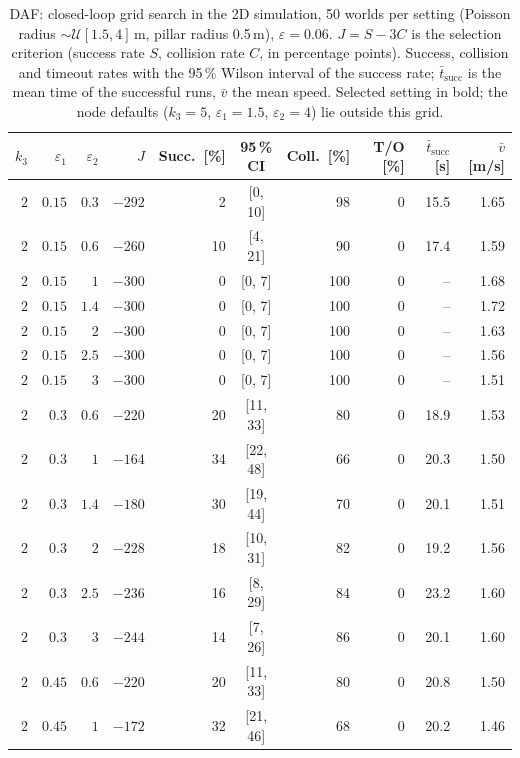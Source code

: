 \begin{table}[t]
\centering
\small
\caption{DAF: closed-loop grid search in the 2D simulation, 50 worlds per setting (Poisson radius $\sim\mathcal{U}[1.5, 4]$\,m, pillar radius 0.5\,m), $\varepsilon = 0.06$. $J = S - 3C$ is the selection criterion (success rate $S$, collision rate $C$, in percentage points). Success, collision and timeout rates with the 95\,\% Wilson interval of the success rate; $\bar t_\mathrm{succ}$ is the mean time of the successful runs, $\bar v$ the mean speed. Selected setting in bold; the node defaults ($k_3 = 5$, $\varepsilon_1 = 1.5$, $\varepsilon_2 = 4$) lie outside this grid.}
\label{tab:gridsearch_daf}
\begin{tabular}{rrrrrcrrrr}
\toprule
$k_3$ & $\varepsilon_1$ & $\varepsilon_2$ & $J$ & Succ.\ [\%] & 95\,\% CI & Coll.\ [\%] & T/O [\%] & $\bar t_\mathrm{succ}$ [s] & $\bar v$ [m/s] \\
\midrule
$2$ & $0.15$ & $0.3$ & $-292$ & 2 & [0, 10] & 98 & 0 & 15.5 & 1.65 \\
$2$ & $0.15$ & $0.6$ & $-260$ & 10 & [4, 21] & 90 & 0 & 17.4 & 1.59 \\
$2$ & $0.15$ & $1$ & $-300$ & 0 & [0, 7] & 100 & 0 & -- & 1.68 \\
$2$ & $0.15$ & $1.4$ & $-300$ & 0 & [0, 7] & 100 & 0 & -- & 1.72 \\
$2$ & $0.15$ & $2$ & $-300$ & 0 & [0, 7] & 100 & 0 & -- & 1.63 \\
$2$ & $0.15$ & $2.5$ & $-300$ & 0 & [0, 7] & 100 & 0 & -- & 1.56 \\
$2$ & $0.15$ & $3$ & $-300$ & 0 & [0, 7] & 100 & 0 & -- & 1.51 \\
$2$ & $0.3$ & $0.6$ & $-220$ & 20 & [11, 33] & 80 & 0 & 18.9 & 1.53 \\
$2$ & $0.3$ & $1$ & $-164$ & 34 & [22, 48] & 66 & 0 & 20.3 & 1.50 \\
$2$ & $0.3$ & $1.4$ & $-180$ & 30 & [19, 44] & 70 & 0 & 20.1 & 1.51 \\
$2$ & $0.3$ & $2$ & $-228$ & 18 & [10, 31] & 82 & 0 & 19.2 & 1.56 \\
$2$ & $0.3$ & $2.5$ & $-236$ & 16 & [8, 29] & 84 & 0 & 23.2 & 1.60 \\
$2$ & $0.3$ & $3$ & $-244$ & 14 & [7, 26] & 86 & 0 & 20.1 & 1.60 \\
$2$ & $0.45$ & $0.6$ & $-220$ & 20 & [11, 33] & 80 & 0 & 20.8 & 1.50 \\
$2$ & $0.45$ & $1$ & $-172$ & 32 & [21, 46] & 68 & 0 & 20.2 & 1.46 \\

\end{tabular}
\end{table}
